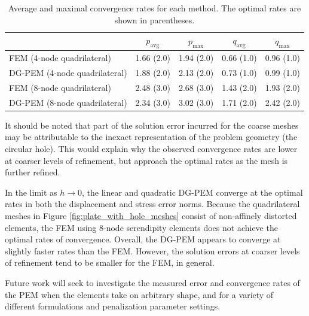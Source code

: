 \begin{table}[!ht]
  \begin{center}
    \begin{tabular}{| l || c | c || c | c |}
    \hline
           & $p_{\text{avg}}$ & $p_{\text{max}}$ & $q_{\text{avg}}$ & $q_{\text{max}}$ \\ \hline \hline
    FEM (4-node quadrilateral)    & 1.66 (2.0) & 1.94 (2.0) & 0.66 (1.0) & 0.96 (1.0) \\ \hline
    DG-PEM (4-node quadrilateral) & 1.88 (2.0) & 2.13 (2.0) & 0.73 (1.0) & 0.99 (1.0) \\ \hline
    FEM (8-node quadrilateral)    & 2.48 (3.0) & 2.68 (3.0) & 1.43 (2.0) & 1.93 (2.0) \\ \hline
    DG-PEM (8-node quadrilateral) & 2.34 (3.0) & 3.02 (3.0) & 1.71 (2.0) & 2.42 (2.0) \\
    \hline
    \end{tabular}
    \caption{Average and maximal convergence rates for each method. The optimal rates are shown in parentheses.}
    \vspace{-5pt}
    \label{tab:plate_with_hole_convergence_rates}
    \vspace{-10pt}
  \end{center}
\end{table}

It should be noted that part of the solution error incurred for the coarse meshes may be attributable to the inexact representation of the problem geometry (the circular hole). This would explain why the observed convergence rates are lower at coarser levels of refinement, but approach the optimal rates as the mesh is further refined.

In the limit as $h \rightarrow 0$, the linear and quadratic DG-PEM converge at the optimal rates in both the displacement and stress error norms. Because the quadrilateral meshes in Figure \ref{fig:plate_with_hole_meshes} consist of non-affinely distorted elements, the FEM using 8-node serendipity elements does not achieve the optimal rates of convergence. Overall, the DG-PEM appears to converge at slightly faster rates than the FEM. However, the solution errors at coarser levels of refinement tend to be smaller for the FEM, in general.

Future work will seek to investigate the measured error and convergence rates of the PEM when the elements take on arbitrary shape, and for a variety of different formulations and penalization parameter settings.

